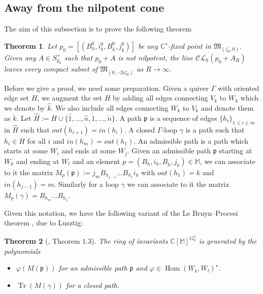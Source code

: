\documentclass[12pt,oneside,reqno]{amsart}
\newtheorem{theorem}{Theorem}
\theoremstyle{definition}
\numberwithin{equation}{section}
\numberwithin{theorem}{section}
\newcommand{\R}{\mathbb{R}}
\newcommand{\C}{\mathbb{C}}
\newcommand{\Tr}{\operatorname{Tr}}
\newcommand{\Hom}{\operatorname{Hom}}
\begin{document}
\subsection{Away from the nilpotent cone}
The aim of this subsection is to prove the following theorem
%
\begin{theorem}
Let $p_0 = [(B_h^0,i_k^0,B_{\bar h}^0,j_k^0)]$ be any $\C^{\star}$-fixed point in $\mathfrak M_{(\zeta_{\R},0)}$. Given any $A\in S^+_{p_0}$ such that $p_0+A$ is not nilpotent, the line $\mathcal{CL}_{\hbar}(p_0+A_R)$ leaves every compact subset of $\mathfrak M_{(0,-2i\zeta_{\R})}$ as $R\to \infty$. 
\end{theorem}
%
Before we give a proof, we need some preparation. Given a quiver $\Gamma$ with oriented edge set $H$, we augment the set $H$ by adding all edges connecting $V_k$ to $W_k$ which we denote by $\hat k$. We also include all edges connecting $W_k$ to $V_k$ and denote them as $\check k$. Let $\hat H := H\cup\{\hat 1,...,\hat n, \check 1,...,\check n\}$. A path $\mathfrak p$ is a sequence of edges $\{h_i\}_{1\le i \le m}$ in $\hat H$ such that $out(h_{i+1}) = in(h_i)$. A closed $\Gamma$-loop $\gamma$ is a path such that $h_i\in H$ for all $i$ and $in(h_m) = out(h_1)$. An admissible path is a path which starts at some $W_i$ and ends at some $W_j$. Given an admissible path $\mathfrak p$ starting at $W_k$ and ending at $W_l$ and an element $p=(B_h,i_k,B_{\bar h},j_k)\in \mathbb M$, we can associate to it the matrix $M_p(\mathfrak p):= j_m B_{h_{j-1}}... B_{h_1}i_k$ with $out(h_1) = k$ and $in(h_{j-1})= m$. Similarly for a loop $\gamma$ we can associate to it the matrix $M_p(\gamma) = B_{h_m}...B_{h_1}$. 

Given this notation, we have the following variant of the Le Bruyn--Procesi theorem \cite{LP1990},\citep[][Theorem 10.2.2. and Exercise 10.2.2.]{QuiverBook} due to Lusztig:

%
\begin{theorem}[\cite{L1998}, Theorem $1.3$]\label{Lusztig}
The ring of invariants $\C[\mathbb M]^{G_{\mathbf{v}}^{\C}}$ is generated by the polynomials 
%
\begin{itemize}
\item $\varphi(M(\mathfrak p))$ for an admissible path $\mathfrak p$ and $\varphi \in \Hom(W_k,W_l)^{\star}$. 
\item $\Tr(M(\gamma))$ for a closed path. 
\end{itemize}
%
\end{theorem}
%
\end{document}
